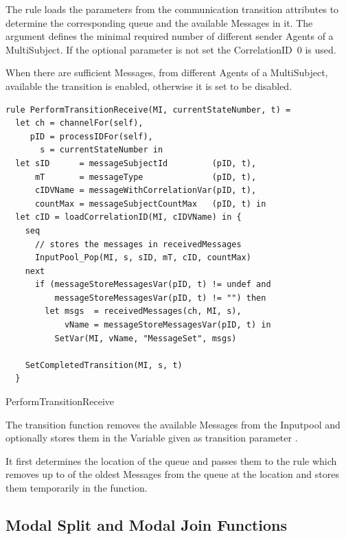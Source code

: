 The  rule loads the parameters from the communication transition attributes
to determine the corresponding queue and the available Messages in it. The
 argument defines the minimal required
number of different sender Agents of a MultiSubject. If the optional
parameter  is not set the
CorrelationID~0 is used.

When there are sufficient Messages, from different Agents of a MultiSubject,
available the transition is enabled, otherwise it is set to be disabled.



\begin{listing}[htbp]
\begin{verbatim}
rule PerformTransitionReceive(MI, currentStateNumber, t) =
  let ch = channelFor(self),
     pID = processIDFor(self),
       s = currentStateNumber in
  let sID      = messageSubjectId         (pID, t),
      mT       = messageType              (pID, t),
      cIDVName = messageWithCorrelationVar(pID, t),
      countMax = messageSubjectCountMax   (pID, t) in
  let cID = loadCorrelationID(MI, cIDVName) in {
    seq
      // stores the messages in receivedMessages
      InputPool_Pop(MI, s, sID, mT, cID, countMax)
    next
      if (messageStoreMessagesVar(pID, t) != undef and
          messageStoreMessagesVar(pID, t) != "") then
        let msgs  = receivedMessages(ch, MI, s),
            vName = messageStoreMessagesVar(pID, t) in
          SetVar(MI, vName, "MessageSet", msgs)

    SetCompletedTransition(MI, s, t)
  }
\end{verbatim}
\caption{PerformTransitionReceive}
\label{lst:shortasm:PerformTransitionReceive}
\end{listing}

The transition function removes the available Messages from the Inputpool and
optionally stores them in the Variable given as transition parameter
.

It first determines the location of the queue and passes them to the
 rule which removes up to 
of the oldest Messages from the queue at the location
and stores them temporarily in the  function.


\subsection{Modal Split and Modal Join Functions}


